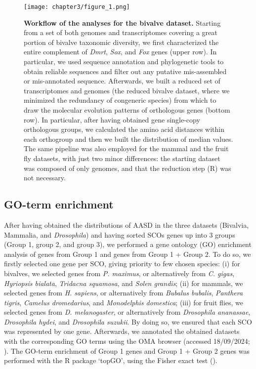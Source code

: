 \documentclass[../main.tex]{subfiles}
\begin{document}
\begin{figure}[t]
    \centering
    \texttt{[image: chapter3/figure\_1.png]}
    \captionsetup{width=\textwidth}
    \caption{
    \textbf{Workflow of the analyses for the bivalve dataset.} Starting from a set of both genomes and transcriptomes covering a great portion of bivalve taxonomic diversity, we first characterized the entire complement of \textit{Dmrt}, \textit{Sox}, and \textit{Fox} genes (upper row). In particular, we used sequence annotation and phylogenetic tools to obtain reliable sequences and filter out any putative mis-assembled or mis-annotated sequence. Afterwards, we built a reduced set of transcriptomes and genomes (the reduced bivalve dataset, where we minimized the redundancy of congeneric species) from which to draw the molecular evolution patterns of orthologous genes (bottom row). In particular, after having obtained gene single-copy orthologous groups, we calculated the amino acid distances within each orthogroup and then we built the distribution of median values. The same pipeline was also employed for the mammal and the fruit fly datasets, with just two minor differences: the starting dataset was composed of only genomes, and that the reduction step (R) was not necessary.
    }
    \label{fig:workflow}
\end{figure}

\subsection{GO-term enrichment}
After having obtained the distributions of AASD in the three datasets (Bivalvia, Mammalia, and \textit{Drosophila}) and having sorted SCOs genes up into 3 groups (Group 1, group 2, and group 3), we performed a gene ontology (GO) enrichment analysis of genes from Group 1 and genes from Group 1 + Group 2. To do so, we firstly selected one gene per SCO, giving priority to few chosen species: (i) for bivalves, we selected genes from \textit{P. maximus}, or alternatively from \textit{C. gigas}, \textit{Hyriopsis bialata}, \textit{Tridacna squamosa}, and \textit{Solen grandis}; (ii) for mammals, we selected genes from \textit{H. sapiens}, or alternatively from \textit{Bubalus bubalis}, \textit{Panthera tigris}, \textit{Camelus dromedarius}, and \textit{Monodelphis domestica}; (iii) for fruit flies, we selected genes from \textit{D. melanogaster}, or alternatively from \textit{Drosophila ananassae}, \textit{Drosophila hydei}, and \textit{Drosophila suzukii}. By doing so, we ensured that each SCO was represented by one gene. Afterwards, we annotated the obtained datasets with the corresponding GO terms using the OMA browser (accessed 18/09/2024; \textbf{\cite{altenhoff2024oma}}). The GO-term enrichment of Group 1 genes and Group 1 + Group 2 genes was performed with the R package ‘topGO’, using the Fisher exact test (\textbf{\cite{alexa2009gene}}).
\end{document}
